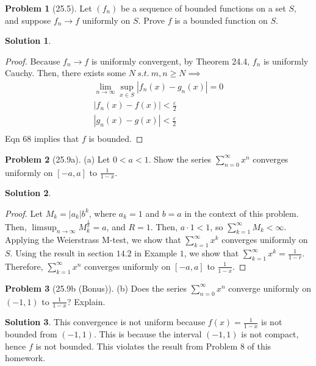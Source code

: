 \documentclass[12pt]{article}
\theoremstyle{definition} %
\newtheorem{solution}{Solution}
\newtheorem{problem}{Problem}
\theoremstyle{plain} %
\begin{document}
\begin{problem}[25.5]
    Let \( (f_n) \) be a sequence of bounded functions on a set \( S \), and suppose \( f_n \to f \) uniformly on \( S \). Prove \( f \) is a bounded function on \( S \).
\end{problem}
\begin{solution}
    \begin{proof}
        Because \(f_{n}\to f\) is uniformly convergent, by Theorem 24.4, \(f_{n}\) is uniformly Cauchy. Then, there exists some \(N \ s.t. \ m,n \geq N \implies \) 
    \begin{align}
        \lim_{n \to \infty} \sup_{x\in S} \left\vert f_{n}(x) - g_{n}(x) \right\vert =0\\[10pt]
        \left\vert f_{n}(x)-f(x) \right\vert < \frac{\varepsilon}{2}\\[10pt] 
        \left\vert g_{n}(x)-g(x) \right\vert < \frac{\varepsilon}{2}\\[10pt] 
    \end{align}
    Eqn 68 implies that \(f\) is bounded.
    \end{proof}
\end{solution}
\begin{problem}[25.9a]
    (a) Let \( 0 < a < 1 \). Show the series \( \sum_{n=0}^{\infty} x^n \) converges uniformly on \( [-a, a] \) to \( \frac{1}{1 - x} \).
\end{problem}
\begin{solution}
    \begin{proof}
        Let \(M_k=\left\vert a_{k} \right\vert b^{k}\), where \(a_k = 1\) and \(b = a\) in the context of this problem. Then, \(\limsup_{n \to \infty} M_k^{\frac{1}{k}}=a\), and \(R=1\). Then, \(a \cdot 1 < 1\), so \(\sum_{k=1}^{\infty} M_k < \infty\). Applying the Weierstrass M-test, we show that \(\sum_{k=1}^{\infty} x^{k}\) converges uniformly on \(S\). Using the result in section \(14.2\) in Example \(1\), we show that \(\sum_{k=1}^{\infty} x^{k} = \frac{1}{1-r}\). Therefore, \(\sum_{k=1}^{\infty} x^{n}\) converges uniformly on \([-a,a]\) to \(\frac{1}{1-x}\).       
    \end{proof}
\end{solution}
\begin{problem}[25.9b (Bonus)]
    (b) Does the series \( \sum_{n=0}^{\infty} x^n \) converge uniformly on \( (-1, 1) \) to \( \frac{1}{1 - x} \)? Explain.
\end{problem}
\begin{solution}
    This convergence is not uniform because \(f(x)=\frac{1}{1-x}\) is not bounded from \((-1,1)\). This is because the interval \((-1,1)\) is not compact, hence \(f\) is not bounded. This violates the result from Problem 8 of this homework.
\end{solution}
\end{document}
